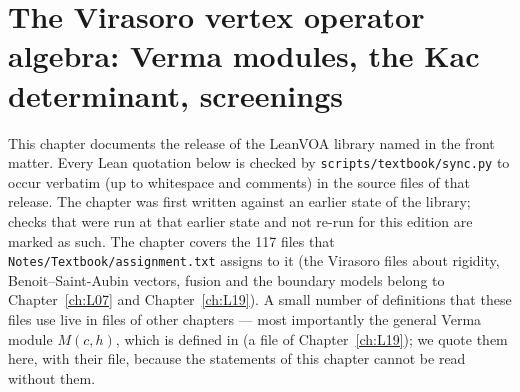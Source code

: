 \chapter[The Virasoro VOA: Verma modules, Kac determinant, screenings]{The Virasoro vertex operator algebra: Verma modules, the Kac determinant, screenings}\label{ch:L06}
\begingroup\setlength{\emergencystretch}{3em}

\providecommand{\lsixvac}{\mathbf{1}}
\providecommand{\lsixVir}{\mathfrak{Vir}}
\providecommand{\lsixU}{U(\mathfrak{Vir})}
\providecommand{\lsixV}{V(c,0)}
\providecommand{\lsixL}{L(c,0)}
\providecommand{\lsixM}{M(c,h)}
\providecommand{\lsixK}{K}
\providecommand{\lsixhrs}{h_{r,s}}
\providecommand{\lsixct}{c(t)}
\providecommand{\lsixpp}{\mathrm{p}}
\providecommand{\lsixpt}{\mathrm{p}_{2}}
\providecommand{\lsixG}{G}
\providecommand{\lsixform}[2]{\langle #1,#2\rangle}

This chapter documents the release of the LeanVOA library named in the front matter. Every Lean quotation below is checked by \texttt{scripts/textbook/sync.py}
to occur verbatim (up to whitespace and comments) in the source files of that release. The chapter was
first written against an earlier state of the library; checks that were run at that earlier state and not re-run for this edition are marked as such. The chapter covers the 117 files
 that \texttt{Notes/Textbook/assignment.txt} assigns to it
(the Virasoro files about rigidity, Benoit--Saint-Aubin vectors, fusion and the boundary models belong
to Chapter~\ref{ch:L07} and Chapter~\ref{ch:L19}). A small number of definitions that these files
use live in files of other chapters --- most importantly the general Verma module $M(c,h)$, which is
defined in  (a file of
Chapter~\ref{ch:L19}); we quote them here, with their file, because the statements of this chapter
cannot be read without them.


